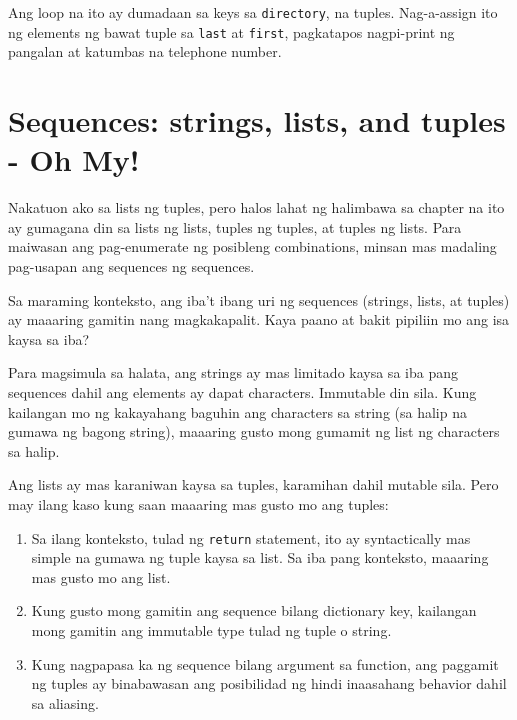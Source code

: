 \documentclass[10pt,]{book}
\begin{document}
Ang loop na ito ay dumadaan sa keys sa \texttt{directory}, na tuples.
Nag-a-assign ito ng elements ng bawat tuple sa \texttt{last} at
\texttt{first}, pagkatapos nagpi-print ng pangalan at katumbas na
telephone number.

\section{Sequences: strings, lists, and tuples - Oh
My!}\label{sequences-strings-lists-and-tuples---oh-my}


Nakatuon ako sa lists ng tuples, pero halos lahat ng halimbawa sa
chapter na ito ay gumagana din sa lists ng lists, tuples ng tuples, at
tuples ng lists. Para maiwasan ang pag-enumerate ng posibleng
combinations, minsan mas madaling pag-usapan ang sequences ng sequences.

Sa maraming konteksto, ang iba't ibang uri ng sequences (strings, lists,
at tuples) ay maaaring gamitin nang magkakapalit. Kaya paano at bakit
pipiliin mo ang isa kaysa sa iba?

   

Para magsimula sa halata, ang strings ay mas limitado kaysa sa iba pang
sequences dahil ang elements ay dapat characters. Immutable din sila.
Kung kailangan mo ng kakayahang baguhin ang characters sa string (sa
halip na gumawa ng bagong string), maaaring gusto mong gumamit ng list
ng characters sa halip.

Ang lists ay mas karaniwan kaysa sa tuples, karamihan dahil mutable
sila. Pero may ilang kaso kung saan maaaring mas gusto mo ang tuples:

\begin{enumerate}
\def\labelenumi{\arabic{enumi}.}
\item
  Sa ilang konteksto, tulad ng \texttt{return} statement, ito ay
  syntactically mas simple na gumawa ng tuple kaysa sa list. Sa iba pang
  konteksto, maaaring mas gusto mo ang list.
\item
  Kung gusto mong gamitin ang sequence bilang dictionary key, kailangan
  mong gamitin ang immutable type tulad ng tuple o string.
\item
  Kung nagpapasa ka ng sequence bilang argument sa function, ang
  paggamit ng tuples ay binabawasan ang posibilidad ng hindi inaasahang
  behavior dahil sa aliasing.
\end{enumerate}
\end{document}
